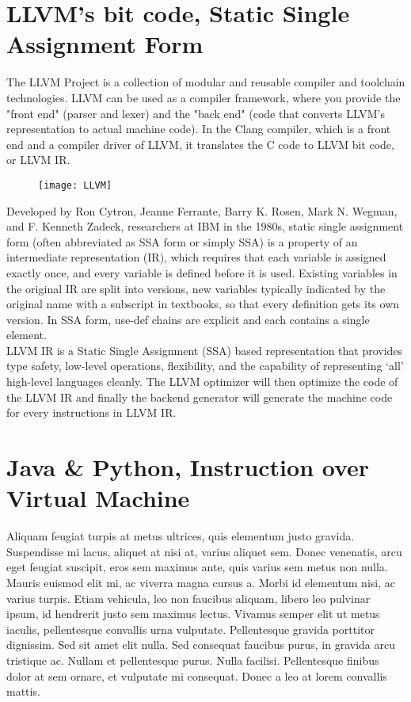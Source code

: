 \section{LLVM's bit code, Static Single Assignment Form}
The LLVM Project is a collection of modular and reusable compiler and toolchain technologies. LLVM can be used as a compiler framework, where you provide the "front end" (parser and lexer) and the "back end" (code that converts LLVM's representation to actual machine code). In the Clang compiler, which is a front end and a compiler driver of LLVM, it translates the C code to LLVM bit code, or LLVM IR. \\
\begin{figure}[h]
\centering
\texttt{[image: LLVM]}
\end{figure}
Developed by Ron Cytron, Jeanne Ferrante, Barry K. Rosen, Mark N. Wegman, and F. Kenneth Zadeck, researchers at IBM in the 1980s, static single assignment form (often abbreviated as SSA form or simply SSA) is a property of an intermediate representation (IR), which requires that each variable is assigned exactly once, and every variable is defined before it is used. Existing variables in the original IR are split into versions, new variables typically indicated by the original name with a subscript in textbooks, so that every definition gets its own version. In SSA form, use-def chains are explicit and each contains a single element. \\
LLVM IR is a Static Single Assignment (SSA) based representation that provides type safety, low-level operations, flexibility, and the capability of representing ‘all’ high-level languages cleanly. The LLVM optimizer will then optimize the code of the LLVM IR and finally the backend generator will generate the machine code for every instructions in LLVM IR. \\


\section{Java \& Python, Instruction over Virtual Machine}
Aliquam feugiat turpis at metus ultrices, quis elementum justo gravida. Suspendisse mi lacus, aliquet at nisi at, varius aliquet sem. Donec venenatis, arcu eget feugiat suscipit, eros sem maximus ante, quis varius sem metus non nulla. Mauris euismod elit mi, ac viverra magna cursus a. Morbi id elementum nisi, ac varius turpis. Etiam vehicula, leo non faucibus aliquam, libero leo pulvinar ipsum, id hendrerit justo sem maximus lectus. Vivamus semper elit ut metus iaculis, pellentesque convallis urna vulputate. Pellentesque gravida porttitor dignissim. Sed sit amet elit nulla. Sed consequat faucibus purus, in gravida arcu tristique ac. Nullam et pellentesque purus. Nulla facilisi. Pellentesque finibus dolor at sem ornare, et vulputate mi consequat. Donec a leo at lorem convallis mattis.

